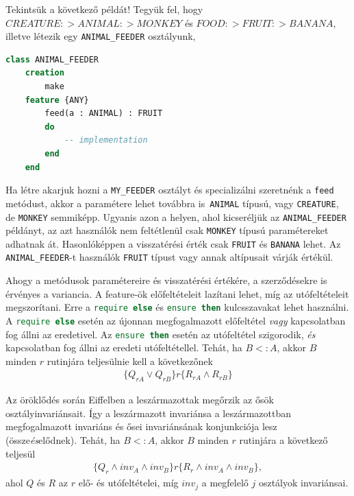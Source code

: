 	Tekintsük a következő példát! Tegyük fel, hogy $ CREATURE :> ANIMAL :> MONKEY$ és $FOOD :> FRUIT :> BANANA$, illetve létezik egy \lstinline[language=Eiffel]|ANIMAL_FEEDER| osztályunk,
	\begin{lstlisting}[language=Eiffel]
	class ANIMAL_FEEDER 
	creation
		make
	feature {ANY}
		feed(a : ANIMAL) : FRUIT
		do 
			-- implementation
		end
	end
	\end{lstlisting}
	Ha létre akarjuk hozni a \lstinline[language=Eiffel]|MY_FEEDER| osztályt és specializálni szeretnénk a \lstinline[language=Eiffel]|feed| metódust, akkor a paramétere lehet továbbra is\lstinline[language=Eiffel]| ANIMAL| típusú, vagy \lstinline[language=Eiffel]|CREATURE|, de \lstinline[language=Eiffel]|MONKEY| semmiképp. Ugyanis azon a helyen, ahol kicseréljük az \lstinline[language=Eiffel]|ANIMAL_FEEDER| példányt, az azt használók nem feltétlenül csak \lstinline[language=Eiffel]|MONKEY| típusú paramétereket adhatnak át. Hasonlóképpen a visszatérési érték csak \lstinline[language=Eiffel]|FRUIT| és \lstinline[language=Eiffel]|BANANA| lehet. Az \lstinline[language=Eiffel]|ANIMAL_FEEDER|-t használók \lstinline[language=Eiffel]|FRUIT| típust vagy annak altípusait várják értékül.
	
	Ahogy a metódusok paramétereire és visszatérési értékére, a szerződésekre is érvényes a variancia. A feature-ök előfeltételeit lazítani lehet, míg az utófeltételeit megszorítani. Erre a \lstinline[language=Eiffel]|require else| és \lstinline[language=Eiffel]|ensure then| kulcsszavakat lehet használni. A \lstinline[language=Eiffel]|require else| esetén az újonnan megfogalmazott előfeltétel \textit{vagy} kapcsolatban fog állni az eredetivel. Az \lstinline[language=Eiffel]|ensure then| esetén az utófeltétel szigorodik, \textit{és} kapcsolatban fog állni az eredeti utófeltétellel.
	Tehát, ha $B <: A$, akkor $B$ minden $r$ rutinjára teljesülnie kell a következőnek
	\begin{align*}
	\{Q_{rA} \vee Q_{rB}\} r \{R_{rA} \wedge R_{rB}\}
	\end{align*}	
	
	Az öröklődés során Eiffelben a leszármazottak megőrzik az ősök osztályinvariánsait. Így a leszármazott invariánsa a leszármazottban megfogalmazott invariáns és ősei invariánsának konjunkciója lesz (össze\textit{és}elődnek).
	Tehát, ha $B <: A $, akkor $B$ minden $r$ rutinjára a következő teljesül
	\begin{align*}
	\{Q_r \wedge inv_A \wedge inv_B\} r \{R_r \wedge inv_A \wedge inv_B\},
	\end{align*}
	ahol $Q$ és $R$ az $r$ elő- és utófeltételei, míg $inv_j$ a megfelelő $j$ osztályok invariánsai.


